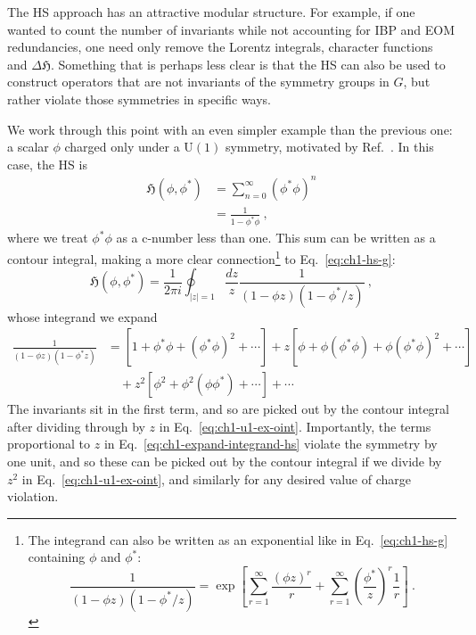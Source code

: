 The HS approach has an attractive modular structure. For example, if one wanted
to count the number of invariants while not accounting for IBP and EOM
redundancies, one need only remove the Lorentz integrals, character functions
and $\Delta \mathfrak{H}$. Something that is perhaps less clear is that the HS
can also be used to construct operators that are not invariants of the symmetry
groups in $G$, but rather violate those symmetries in specific ways.

We work through this point with an even simpler example than the previous one: a
scalar $\phi$ charged only under a $\mathrm{U}(1)$ symmetry, motivated by
Ref.~\cite{Lehman:2015via}. In this case, the HS is
\begin{align}
  \mathfrak{H}(\phi, \phi^{*}) &= \sum_{n=0}^{\infty} (\phi^{*}\phi)^{n} \\
  &= \frac{1}{1 - \phi^{*} \phi} \ ,
\end{align}
where we treat $\phi^{*}\phi$ as a c-number less than one. This sum can be
written as a contour integral, making a more clear connection\footnote{The
  integrand can also be written as an exponential like in Eq.~\eqref{eq:ch1-hs-g}
  containing $\phi$ and $\phi^{*}$:
\begin{equation*}
  \frac{1}{(1 - \phi z)(1 - \phi^{*}/z)} = \exp \left[ \sum_{r=1}^{\infty} \frac{(\phi z)^{r}}{r} + \sum_{r=1}^{\infty} \left(\frac{\phi^{*}}{z}\right)^{r}\frac{1}{r} \right] \ .
\end{equation*}} to
Eq.~\eqref{eq:ch1-hs-g}:
\begin{equation}
  \label{eq:ch1-u1-ex-oint}
  \mathfrak{H}(\phi, \phi^{*}) = \frac{1}{2\pi i} \oint_{|z|=1} \frac{dz}{z} \frac{1}{(1 - \phi z)(1 - \phi^{*}/z)} \ ,
\end{equation}
whose integrand we expand
\begin{equation}
  \label{eq:ch1-expand-integrand-hs}
  \begin{aligned}
  \frac{1}{(1 - \phi z)(1 - \phi^{*} z)} &= [1 + \phi^{*}\phi + (\phi^{*}\phi)^{2} + \cdots] + z [\phi + \phi (\phi^{*}\phi) + \phi(\phi^{*}\phi)^{2} + \cdots] \\
 &\quad + z^2 [\phi^2 + \phi^2 (\phi \phi^*) + \cdots] + \cdots
  \end{aligned}
\end{equation}
The invariants sit in the first term, and so are picked out by the contour
integral after dividing through by $z$ in Eq.~\eqref{eq:ch1-u1-ex-oint}.
Importantly, the terms proportional to $z$ in Eq.~\eqref{eq:ch1-expand-integrand-hs}
violate the symmetry by one unit, and so these can be picked out by the contour
integral if we divide by $z^{2}$ in Eq.~\eqref{eq:ch1-u1-ex-oint}, and similarly for
any desired value of charge violation.

